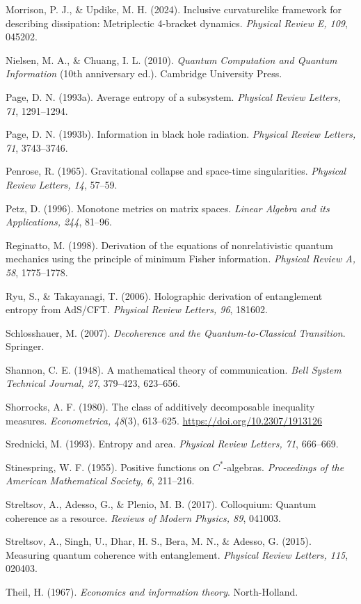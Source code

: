 \documentclass[
  11pt,
]{article}
\begin{document}
Morrison, P. J., \& Updike, M. H. (2024). Inclusive curvaturelike
framework for describing dissipation: Metriplectic 4-bracket dynamics.
\emph{Physical Review E, 109}, 045202.

Nielsen, M. A., \& Chuang, I. L. (2010). \emph{Quantum Computation and
Quantum Information} (10th anniversary ed.). Cambridge University Press.

Page, D. N. (1993a). Average entropy of a subsystem. \emph{Physical
Review Letters, 71}, 1291--1294.

Page, D. N. (1993b). Information in black hole radiation. \emph{Physical
Review Letters, 71}, 3743--3746.

Penrose, R. (1965). Gravitational collapse and space-time singularities.
\emph{Physical Review Letters, 14}, 57--59.

Petz, D. (1996). Monotone metrics on matrix spaces. \emph{Linear Algebra
and its Applications, 244}, 81--96.

Reginatto, M. (1998). Derivation of the equations of nonrelativistic
quantum mechanics using the principle of minimum Fisher information.
\emph{Physical Review A, 58}, 1775--1778.

Ryu, S., \& Takayanagi, T. (2006). Holographic derivation of
entanglement entropy from AdS/CFT. \emph{Physical Review Letters, 96},
181602.

Schlosshauer, M. (2007). \emph{Decoherence and the Quantum-to-Classical
Transition}. Springer.

Shannon, C. E. (1948). A mathematical theory of communication.
\emph{Bell System Technical Journal, 27}, 379--423, 623--656.

Shorrocks, A. F. (1980). The class of additively decomposable inequality
measures. \emph{Econometrica, 48}(3), 613--625.
\url{https://doi.org/10.2307/1913126}

Srednicki, M. (1993). Entropy and area. \emph{Physical Review Letters,
71}, 666--669.

Stinespring, W. F. (1955). Positive functions on \(C^*\)-algebras.
\emph{Proceedings of the American Mathematical Society, 6}, 211--216.

Streltsov, A., Adesso, G., \& Plenio, M. B. (2017). Colloquium: Quantum
coherence as a resource. \emph{Reviews of Modern Physics, 89}, 041003.

Streltsov, A., Singh, U., Dhar, H. S., Bera, M. N., \& Adesso, G.
(2015). Measuring quantum coherence with entanglement. \emph{Physical
Review Letters, 115}, 020403.

Theil, H. (1967). \emph{Economics and information theory}.
North-Holland.
\end{document}
